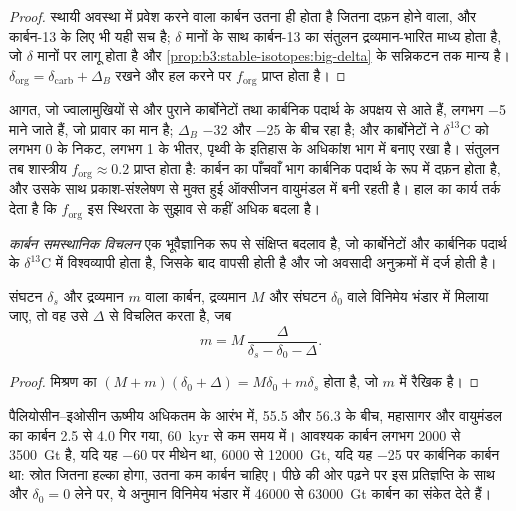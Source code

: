 \begin{proof}
स्थायी अवस्था में प्रवेश करने वाला कार्बन उतना ही होता है जितना दफ़न होने वाला, और कार्बन-13 के लिए भी यही सच है; $\delta$ मानों के साथ कार्बन-13 का संतुलन द्रव्यमान-भारित
माध्य होता है, जो $\delta$ मानों पर लागू होता है और
\cref{prop:b3:stable-isotopes:big-delta} के सन्निकटन तक मान्य है।
$\delta_{\mathrm{org}} =
\delta_{\mathrm{carb}} + \Delta_B$ रखने और हल करने पर $f_{\mathrm{org}}$ प्राप्त होता है।
\end{proof}

आगत, जो ज्वालामुखियों से और पुराने कार्बोनेटों तथा कार्बनिक
पदार्थ के अपक्षय से आते हैं, लगभग \qty{-5}{\permil} माने जाते हैं, जो प्रावार का मान है; $\Delta_B$
$-32$ और \qty{-25}{\permil} के बीच रहा है; और कार्बोनेटों ने
$\delta^{13}\mathrm C$ को लगभग 0 के निकट, लगभग \qty{1}{\permil} के भीतर, पृथ्वी के इतिहास के अधिकांश
भाग में बनाए रखा है। संतुलन तब शास्त्रीय $f_{\mathrm{org}} \approx
0.2$ प्राप्त होता है: कार्बन का पाँचवाँ भाग कार्बनिक पदार्थ के रूप में दफ़न होता है, और उसके साथ
प्रकाश-संश्लेषण से मुक्त हुई ऑक्सीजन वायुमंडल में बनी रहती है। हाल का कार्य तर्क देता है कि
$f_{\mathrm{org}}$ इस स्थिरता के सुझाव से कहीं अधिक बदला है।

\begin{definition}\label{def:b3:stable-isotopes:cie}
\emph{कार्बन समस्थानिक विचलन} एक
भूवैज्ञानिक रूप से संक्षिप्त बदलाव है, जो कार्बोनेटों और कार्बनिक
पदार्थ के $\delta^{13}\mathrm C$ में विश्वव्यापी होता है, जिसके बाद वापसी होती है और जो अवसादी अनुक्रमों में दर्ज होती है।
\end{definition}

\begin{proposition}[विचलन का द्रव्यमान]\label{prop:b3:stable-isotopes:cie-mass}
संघटन $\delta_s$ और द्रव्यमान $m$ वाला कार्बन,
द्रव्यमान $M$ और संघटन $\delta_0$ वाले विनिमेय भंडार में मिलाया जाए, तो वह उसे $\Delta$ से विचलित करता है, जब
\[
m = M\,\frac{\Delta}{\delta_s - \delta_0 - \Delta}.
\]
\end{proposition}

\begin{proof}
मिश्रण का $(M + m)(\delta_0 + \Delta) = M\delta_0 + m\delta_s$ होता है, जो
$m$ में रैखिक है।
\end{proof}

पैलियोसीन--इओसीन ऊष्मीय अधिकतम के आरंभ में, 55.5 और
\qty{56.3}{\Ma} के बीच, महासागर और वायुमंडल का कार्बन 2.5 से
\qty{4.0}{\permil} गिर गया, \qty{60}{kyr} से कम समय में। आवश्यक कार्बन लगभग
2000 से \qty{3500}{Gt} है, यदि यह \qty{-60}{\permil} पर मीथेन था, 6000 से
\qty{12000}{Gt}, यदि यह \qty{-25}{\permil} पर कार्बनिक कार्बन था: स्रोत जितना हल्का
होगा, उतना कम कार्बन चाहिए। पीछे की ओर पढ़ने पर
इस प्रतिज्ञप्ति के साथ और $\delta_0 = 0$ लेने पर, ये अनुमान विनिमेय भंडार में \num{46000}
से \qty{63000}{Gt} कार्बन का संकेत देते हैं।

